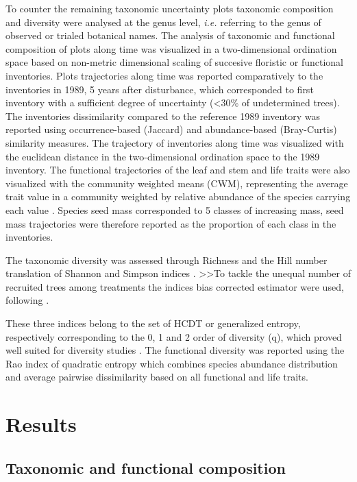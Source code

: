\documentclass[fleqn,10pt]{ArtEcoFoG} %
\theoremstyle{definition}
\theoremstyle{definition}
\theoremstyle{definition}
\theoremstyle{remark}
\begin{document}
To counter the remaining taxonomic uncertainty plots taxonomic
composition and diversity were analysed at the genus level, \emph{i.e.}
referring to the genus of observed or trialed botanical names. The
analysis of taxonomic and functional composition of plots along time was
visualized in a two-dimensional ordination space based on non-metric
dimensional scaling of succesive floristic or functional inventories.
Plots trajectories along time was reported comparatively to the
inventories in 1989, 5 years after disturbance, which corresponded to
first inventory with a sufficient degree of uncertainty (\textless{}30\%
of undetermined trees). The inventories dissimilarity compared to the
reference 1989 inventory was reported using occurrence-based (Jaccard)
and abundance-based (Bray-Curtis) similarity measures. The trajectory of
inventories along time was visualized with the euclidean distance in the
two-dimensional ordination space to the 1989 inventory. The functional
trajectories of the leaf and stem and life traits were also visualized
with the community weighted means (CWM), representing the average trait
value in a community weighted by relative abundance of the species
carrying each value \citep{Diaz2007, Garnier2004}. Species seed mass
corresponded to 5 classes of increasing mass, seed mass trajectories
were therefore reported as the proportion of each class in the
inventories.

The taxonomic diversity was assessed through Richness and the Hill
number translation of Shannon and Simpson indices \citep{Hill1973}.
\textgreater{}\textgreater{}To tackle the unequal number of recruited
trees among treatments the indices bias corrected estimator were used,
following \citep{Chao2015, Marcon2015b}.

These three indices belong to the set of HCDT or generalized entropy,
respectively corresponding to the 0, 1 and 2 order of diversity (q),
which proved well suited for diversity studies
\citep{Patil1982, Tothmeresz1995}. The functional diversity was reported
using the Rao index of quadratic entropy which combines species
abundance distribution and average pairwise dissimilarity based on all
functional and life traits.

\section{Results}\label{results}

\subsection{Taxonomic and functional
composition}\label{taxonomic-and-functional-composition}
\end{document}
